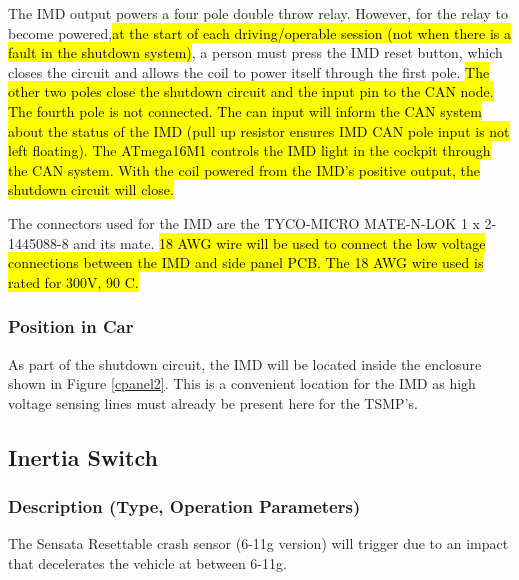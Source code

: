 \documentclass{article}
\DeclareRobustCommand{\hlr}[1]{{\sethlcolor{red}\hl{#1}}}
\begin{document}
            The IMD output powers a four pole double throw relay. However, for the relay to become powered,\hlr{at the start of each driving/operable session (not when there is a fault in the shutdown system)}, a person must press the IMD reset button, which closes the circuit and allows the coil to power itself through the first pole. \hlr{The other two poles close the shutdown circuit and the input pin to the CAN node. The fourth pole is not connected. The can input will inform the CAN system about the status of the IMD (pull up resistor ensures IMD CAN pole input is not left floating). The ATmega16M1 controls the IMD light in the cockpit through the CAN system. With the coil powered from the IMD's positive output, the shutdown circuit will close. }

            The connectors used for the IMD are the TYCO-MICRO MATE-N-LOK 1 x 2-1445088-8 and its mate. \hlr{18 AWG wire will be used to connect the low voltage connections between the IMD and side panel PCB. The 18 AWG wire used is rated for 300V, 90 \degree C.}


        \subsubsection{Position in Car}

            As part of the shutdown circuit, the IMD will be located inside the enclosure shown in Figure \ref{cpanel2}. This is a convenient location for the IMD as high voltage sensing lines must already be present here for the TSMP's.

    \subsection{Inertia Switch}

        \subsubsection{Description (Type, Operation Parameters)}

            The Sensata Resettable crash sensor (6-11g version) will trigger due to an impact that decelerates the vehicle at between 6-11g.
\end{document}
